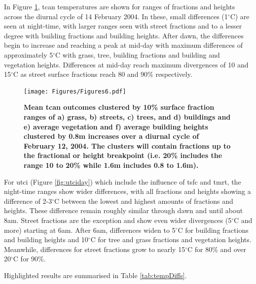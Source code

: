 \documentclass[final,3p,times,authoryear]{elsarticle}
\begin{document}
In Figure \ref{fig:tcanday}, \gls{tcan} temperatures are shown for ranges of fractions and heights across the diurnal cycle of 14 February 2004. In these, small differences (1$^{\circ}$C) are seen at night-time, with larger ranges seen with street fractions and to a lesser degree with building fractions and building heights. After dawn, the differences begin to increase and reaching a peak at mid-day with maximum differences of approximately 5$^{\circ}$C with grass, tree, building fractions and building and vegetation heights. Differences at mid-day reach maximum divergences of 10 and 15$^{\circ}$C as street surface fractions reach 80 and 90\% respectively.

\begin{figure}
\centering
\texttt{[image: Figures/Figures6.pdf]}
\caption{\bf Mean \gls{tcan} outcomes clustered by 10\% surface fraction ranges of a) grass, b) streets, c) trees, and d) buildings and e) average vegetation and f) average building heights clustered by 0.8m increases over a diurnal cycle of February 12, 2004. The clusters will contain fractions up to the fractional or height breakpoint (i.e. 20\% includes the range 10 to 20\%  while 1.6m includes 0.8 to 1.6m). }
 \label{fig:tcanday}
\end{figure}

For \gls{utci} (Figure \ref{fig:utciday}) which include the influence of \gls{tsfc} and \gls{tmrt}, the night-time ranges show wider differences, with all fractions and heights showing a difference of 2-3$^{\circ}$C between the lowest and highest amounts of fractions and heights. These difference remain roughly similar through dawn and until about 8am. Street fractions are the exception and show even wider divergences (5$^{\circ}$C and more) starting at 6am. After 6am, differences widen to 5$^{\circ}$C for building fractions and building heights and 10$^{\circ}$C for tree and grass fractions and vegetation heights. Meanwhile, differences for street fractions grow to nearly 15$^{\circ}$C for 80\% and over 20$^{\circ}$C for 90\%.

Highlighted results are summarised in Table \ref{tab:tempDiffs}.

\end{document}
